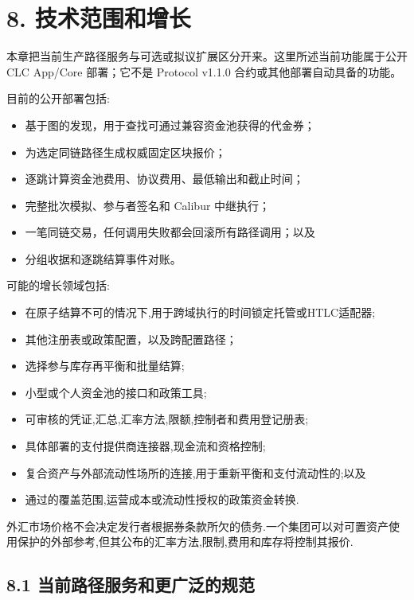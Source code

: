 \documentclass[11pt]{article}
\begin{document}
\section*{8. 技术范围和增长}

本章把当前生产路径服务与可选或拟议扩展区分开来。这里所述当前功能属于公开 CLC App/Core 部署；它不是 Protocol v1.1.0 合约或其他部署自动具备的功能。

目前的公开部署包括:

\begin{itemize}[leftmargin=*]
\item 基于图的发现，用于查找可通过兼容资金池获得的代金券；
\item 为选定同链路径生成权威固定区块报价；
\item 逐跳计算资金池费用、协议费用、最低输出和截止时间；
\item 完整批次模拟、参与者签名和 Calibur 中继执行；
\item 一笔同链交易，任何调用失败都会回滚所有路径调用；以及
\item 分组收据和逐跳结算事件对账。
\end{itemize}
可能的增长领域包括:

\begin{itemize}[leftmargin=*]
\item 在原子结算不可的情况下,用于跨域执行的时间锁定托管或HTLC适配器;
\item 其他注册表或政策配置，以及跨配置路径；
\item 选择参与库存再平衡和批量结算;
\item 小型或个人资金池的接口和政策工具;
\item 可审核的凭证,汇总,汇率方法,限额,控制者和费用登记册表;
\item 具体部署的支付提供商连接器,现金流和资格控制;
\item 复合资产与外部流动性场所的连接,用于重新平衡和支付流动性的;以及
\item 通过的覆盖范围,运营成本或流动性授权的政策资金转换.
\end{itemize}
外汇市场价格不会决定发行者根据券条款所欠的债务.一个集团可以对可置资产使用保护的外部参考,但其公布的汇率方法,限制,费用和库存将控制其报价.

\subsection*{8.1 当前路径服务和更广泛的规范}
\end{document}

